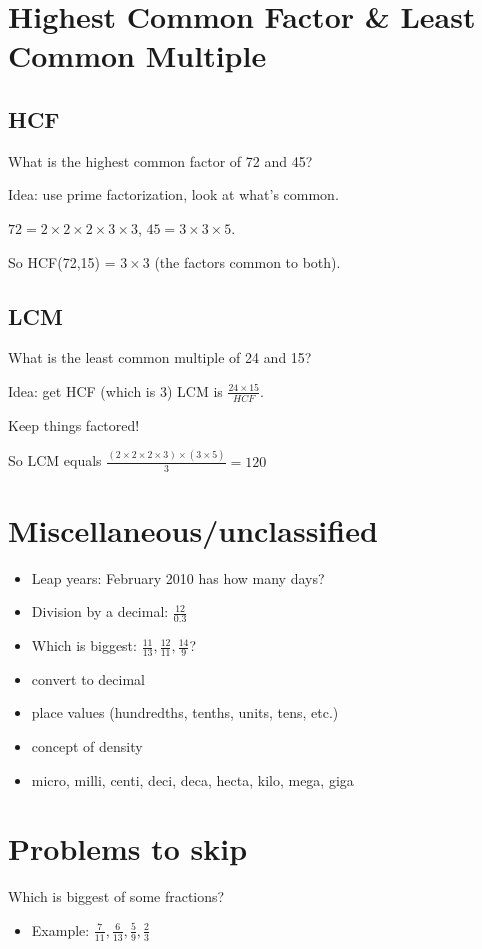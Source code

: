 \documentclass[fullpage,twocolumn]{article}
\begin{document}
\section{
Highest Common Factor \& Least Common Multiple
}


\subsection{HCF}
What is the highest common factor of 72 and 45?

Idea: use prime factorization, look at what's common.

$72 = 2 \times 2 \times 2 \times 3 \times 3 $, $45 = 3 \times 3 \times 5$.

So HCF(72,15) = $ 3 \times 3 $ (the factors common to both).

\subsection{LCM}

What is the least common multiple of 24 and 15?

Idea:  get HCF (which is 3)
LCM is $\frac{24 \times 15}{HCF}$.

Keep things factored!

So LCM equals 
$\frac{(2 \times 2 \times 2 \times 3) \times (3 \times 5)}{ 3} = 120$

\section{Miscellaneous/unclassified}
\begin{itemize}
\item Leap years: February  2010 has how many days?
\item Division by a decimal: $\frac{12}{0.3}$
\item  Which is biggest: $\frac{11}{13}, \frac{12}{11}, \frac{14}{9}$?
\item convert to decimal
\item place values (hundredths, tenths, units, tens, etc.)
\item concept of density
\item micro, milli, centi, deci, deca, hecta, kilo, mega, giga
\end{itemize} 



\section{Problems to skip}
Which is biggest of some fractions? 
\begin{itemize}
\item Example: $\frac{7}{11}, \frac{6}{13}, \frac{5}{9}, \frac{2}{3}$
\end{itemize} 

\end{document}
